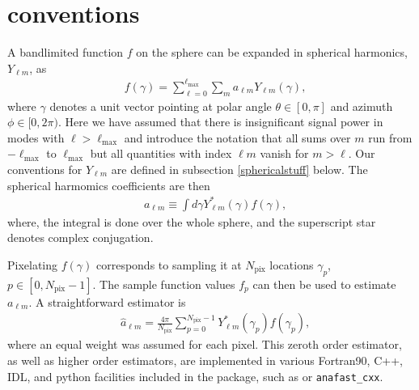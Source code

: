 \documentclass[12pt,twoside]{article}
\newcommand{\myhtmlimage}[1]{ }
\newcommand{\myequal}{=}
\renewcommand{\myequal}{=} %
\newcommand{\npix}{N_{\mathrm{pix}}}
\newcommand{\lmax}{\ell_{\mathrm{max}}}
\begin{document}
\section{\healpix conventions}
\label{sec:conventions}%
A bandlimited function $f$ on the sphere can
be expanded in spherical harmonics, $Y_{\ell m}$,
as
\begin{align}
  \label{eq:alms}
  & f({ \gamma}) = \sum_{\ell =0}^{\lmax}\sum_{m}a_{\ell m}Y_{\ell m}(\gamma),%
\end{align}
where ${{\gamma}}$ denotes a unit vector pointing at polar angle $\theta\in[0,\pi]$ and
azimuth $\phi\in[0,2\pi)$. Here we have assumed that there is insignificant signal power in modes
with $\ell>\lmax$ and introduce the  notation that all sums over $m$ run from
$-\lmax$ to $\lmax$ but all quantities with index ${\ell m}$ vanish
for $m>\ell$. Our conventions for $Y_{\ell m}$ are defined in subsection
\ref{sphericalstuff} below.
The spherical harmomics coefficients are then
\begin{align}
 & a_{\ell m} \equiv \int d\gamma Y^\ast_{\ell m}(\gamma) f(\gamma),\myhtmlimage{}\label{eq:alms_def}
\end{align}
where, the integral is done over the whole sphere, 
and the superscript star denotes complex  conjugation.

Pixelating $f({\gamma})$ corresponds to sampling it at $\npix$
 locations $\gamma_{p}$, $p\in[0,\npix-1]$. The sample
function values $f_p$ can then be used  
to estimate  $a_{\ell m}$.
A straightforward estimator is
\begin{align}
  & \hat{a}_{\ell m} = \frac{4\pi}{\npix}\sum_{p=0}^{\npix-1}
  Y^\ast_{\ell m}(\gamma_p) f(\gamma_p),\myhtmlimage{}\label{eq:hata}
\end{align}
where an equal weight was assumed for each pixel. This
zeroth order estimator, as well as  higher order  estimators, are implemented in various
Fortran90, C++, IDL, and python facilities included in the package, 
such as  or \texttt{anafast\_cxx}.
\end{document}
